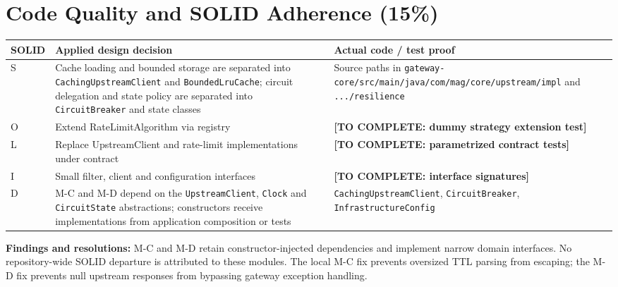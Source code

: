 \documentclass[12pt,a4paper]{article}
\newcommand{\todo}[1]{\textcolor{red!70!black}{\textbf{[TO COMPLETE: #1]}}}
\newcommand{\evidence}[1]{\texttt{#1}}
\begin{document}
\section{Code Quality and SOLID Adherence (15\%)}\label{sec:solid}
\begin{longtable}{L{1cm} L{5.6cm} L{5.7cm}}\toprule
\textbf{SOLID} & \textbf{Applied design decision} & \textbf{Actual code / test proof}\\\midrule\endhead
S & Cache loading and bounded storage are separated into \evidence{CachingUpstreamClient} and \evidence{BoundedLruCache}; circuit delegation and state policy are separated into \evidence{CircuitBreaker} and state classes & Source paths in \texttt{gateway-core/src/main/java/com/mag/core/upstream/impl} and \texttt{.../resilience}\\
O & Extend RateLimitAlgorithm via registry & \todo{dummy strategy extension test}\\
L & Replace UpstreamClient and rate-limit implementations under contract & \todo{parametrized contract tests}\\
I & Small filter, client and configuration interfaces & \todo{interface signatures}\\
D & M-C and M-D depend on the \evidence{UpstreamClient}, \evidence{Clock} and \evidence{CircuitState} abstractions; constructors receive implementations from application composition or tests & \evidence{CachingUpstreamClient}, \evidence{CircuitBreaker}, \evidence{InfrastructureConfig}\\\bottomrule\end{longtable}
\textbf{Findings and resolutions:} M-C and M-D retain constructor-injected dependencies and implement narrow domain interfaces. No repository-wide SOLID departure is attributed to these modules. The local M-C fix prevents oversized TTL parsing from escaping; the M-D fix prevents null upstream responses from bypassing gateway exception handling.
\end{document}
